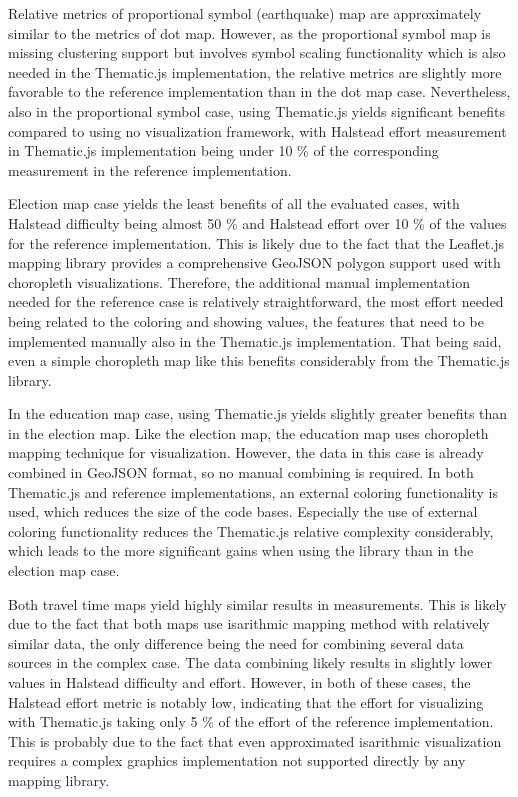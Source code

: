 Relative metrics of proportional symbol (earthquake) map are approximately similar to the metrics of dot map. However, as the proportional symbol map is missing clustering support but involves symbol scaling functionality which is also needed in the Thematic.js implementation, the relative metrics are slightly more favorable to the reference implementation than in the dot map case. Nevertheless, also in the proportional symbol case, using Thematic.js yields significant benefits compared to using no visualization framework, with Halstead effort measurement in Thematic.js implementation being under 10 \% of the corresponding measurement in the reference implementation.

Election map case yields the least benefits of all the evaluated cases, with Halstead difficulty being almost 50 \% and Halstead effort over 10 \% of the values for the reference implementation. This is likely due to the fact that the Leaflet.js mapping library provides a comprehensive GeoJSON polygon support used with choropleth visualizations. Therefore, the additional manual implementation needed for the reference case is relatively straightforward, the most effort needed being related to the coloring and showing values, the features that need to be implemented manually also in the Thematic.js implementation. That being said, even a simple choropleth map like this benefits considerably from the Thematic.js library.

In the education map case, using Thematic.js yields slightly greater benefits than in the election map. Like the election map, the education map uses choropleth mapping technique for visualization. However, the data in this case is already combined in GeoJSON format, so no manual combining is required. In both Thematic.js and reference implementations, an external coloring functionality is used, which reduces the size of the code bases. Especially the use of external coloring functionality reduces the Thematic.js relative complexity considerably, which leads to the more significant gains when using the library than in the election map case.

Both travel time maps yield highly similar results in measurements. This is likely due to the fact that both maps use isarithmic mapping method with relatively similar data, the only difference being the need for combining several data sources in the complex case. The data combining likely results in slightly lower values in Halstead difficulty and effort. However, in both of these cases, the Halstead effort metric is notably low, indicating that the effort for visualizing with Thematic.js taking only 5 \% of the effort of the reference implementation. This is probably due to the fact that even approximated isarithmic visualization requires a complex graphics implementation not supported directly by any mapping library.

